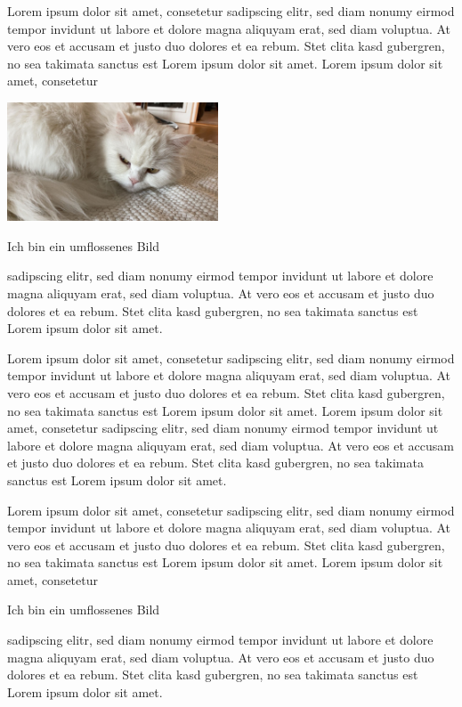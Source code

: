 \documentclass[12pt,ngerman]{scrreprt}
\begin{document}
\listoffigures

\vspace*{3cm}


Lorem ipsum dolor sit amet, consetetur sadipscing elitr, sed diam
nonumy eirmod tempor invidunt ut labore et dolore magna aliquyam erat, sed diam voluptua. At vero eos et accusam et justo duo dolores et ea rebum. Stet clita kasd gubergren, no sea takimata sanctus est Lorem ipsum dolor sit amet. Lorem ipsum dolor sit amet, consetetur
\begin{floatingfigure}{0.5\textwidth}%
  \includegraphics[width=0.47\textwidth]{Bilder/miau.jpg}
  \caption{Ich bin ein umflossenes Bild}
\end{floatingfigure}%
 sadipscing elitr, sed diam nonumy eirmod tempor invidunt ut labore et dolore magna aliquyam erat, sed diam voluptua. At vero eos et accusam et justo duo dolores et ea rebum. Stet clita kasd gubergren, no sea takimata sanctus est Lorem ipsum dolor sit amet.

Lorem ipsum dolor sit amet, consetetur sadipscing elitr, sed diam nonumy eirmod tempor invidunt ut labore et dolore magna aliquyam erat, sed diam voluptua. At vero eos et accusam et justo duo dolores et ea rebum. Stet clita kasd gubergren, no sea takimata sanctus est Lorem ipsum dolor sit amet. Lorem ipsum dolor sit amet, consetetur sadipscing elitr, sed diam nonumy eirmod tempor invidunt ut labore et dolore magna aliquyam erat, sed diam voluptua. At vero eos et accusam et justo duo dolores et ea rebum. Stet clita kasd gubergren, no sea takimata sanctus est Lorem ipsum dolor sit amet.

Lorem ipsum dolor sit amet, consetetur sadipscing elitr, sed diam
nonumy eirmod tempor invidunt ut labore et dolore magna aliquyam erat, sed diam voluptua. At vero eos et accusam et justo duo dolores et ea rebum. Stet clita kasd gubergren, no sea takimata sanctus est Lorem ipsum dolor sit amet. Lorem ipsum dolor sit amet, consetetur

\begin{floatingfigure}{0.5\textwidth}%
  \caption{Ich bin ein umflossenes Bild}
\end{floatingfigure}%

 sadipscing elitr, sed diam nonumy eirmod tempor invidunt ut labore et dolore magna aliquyam erat, sed diam voluptua. At vero eos et accusam et justo duo dolores et ea rebum. Stet clita kasd gubergren, no sea takimata sanctus est Lorem ipsum dolor sit amet.
\end{document}
